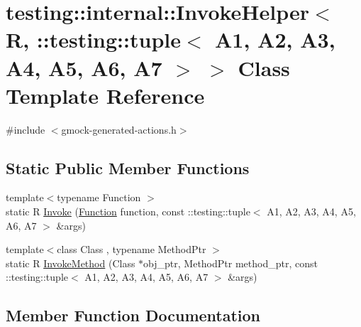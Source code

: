 \hypertarget{classtesting_1_1internal_1_1_invoke_helper_3_01_r_00_01_1_1testing_1_1tuple_3_01_a1_00_01_a2_00_9169216bddd5005837acd145af38ec6f}{}\section{testing\+::internal\+::Invoke\+Helper$<$ R, \+::testing\+::tuple$<$ A1, A2, A3, A4, A5, A6, A7 $>$ $>$ Class Template Reference}
\label{classtesting_1_1internal_1_1_invoke_helper_3_01_r_00_01_1_1testing_1_1tuple_3_01_a1_00_01_a2_00_9169216bddd5005837acd145af38ec6f}


{\ttfamily \#include $<$gmock-\/generated-\/actions.\+h$>$}

\subsection*{Static Public Member Functions}
\begin{DoxyCompactItemize}
\item 
{\footnotesize template$<$typename Function $>$ }\\static R \mbox{\hyperlink{classtesting_1_1internal_1_1_invoke_helper_3_01_r_00_01_1_1testing_1_1tuple_3_01_a1_00_01_a2_00_9169216bddd5005837acd145af38ec6f_a8e2485901be5363b29d29198813374b9}{Invoke}} (\mbox{\hyperlink{structtesting_1_1internal_1_1_function}{Function}} function, const \+::testing\+::tuple$<$ A1, A2, A3, A4, A5, A6, A7 $>$ \&args)
\item 
{\footnotesize template$<$class Class , typename Method\+Ptr $>$ }\\static R \mbox{\hyperlink{classtesting_1_1internal_1_1_invoke_helper_3_01_r_00_01_1_1testing_1_1tuple_3_01_a1_00_01_a2_00_9169216bddd5005837acd145af38ec6f_acd27c62b37fa4f9284dccd8827ddd7af}{Invoke\+Method}} (Class $\ast$obj\+\_\+ptr, Method\+Ptr method\+\_\+ptr, const \+::testing\+::tuple$<$ A1, A2, A3, A4, A5, A6, A7 $>$ \&args)
\end{DoxyCompactItemize}


\subsection{Member Function Documentation}
\mbox{\label{classtesting_1_1internal_1_1_invoke_helper_3_01_r_00_01_1_1testing_1_1tuple_3_01_a1_00_01_a2_00_9169216bddd5005837acd145af38ec6f_a8e2485901be5363b29d29198813374b9}} 
